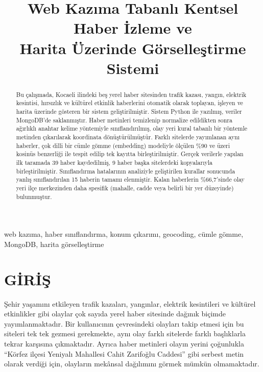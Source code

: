 \documentclass[conference,a4paper]{IEEEtran}
\begin{document}
\title{Web Kazıma Tabanlı Kentsel Haber İzleme ve\\Harita Üzerinde Görselleştirme Sistemi}

\author{

}

\maketitle

\begin{abstract}
Bu çalışmada, Kocaeli ilindeki beş yerel haber sitesinden trafik kazası, yangın,
elektrik kesintisi, hırsızlık ve kültürel etkinlik haberlerini otomatik olarak
toplayan, işleyen ve harita üzerinde gösteren bir sistem geliştirilmiştir. Sistem
Python ile yazılmış, veriler MongoDB'de saklanmıştır. Haber metinleri temizlenip
normalize edildikten sonra ağırlıklı anahtar kelime yöntemiyle sınıflandırılmış,
olay yeri kural tabanlı bir yöntemle metinden çıkarılarak koordinata
dönüştürülmüştür. Farklı sitelerde yayımlanan aynı haberler, çok dilli bir cümle
gömme (embedding) modeliyle ölçülen \%90 ve üzeri kosinüs benzerliği ile tespit
edilip tek kayıtta birleştirilmiştir. Gerçek verilerle yapılan ilk taramada 39
haber kaydedilmiş, 9 haber başka sitelerdeki kopyalarıyla birleştirilmiştir.
Sınıflandırma hatalarının analiziyle geliştirilen kurallar sonucunda yanlış
sınıflandırılan 15 haberin tamamı elenmiştir. Kalan haberlerin \%66,7'sinde olay
yeri ilçe merkezinden daha spesifik (mahalle, cadde veya belirli bir yer
düzeyinde) bulunmuştur.
\end{abstract}

\begin{IEEEkeywords}
web kazıma, haber sınıflandırma, konum çıkarımı, geocoding, cümle gömme,
MongoDB, harita görselleştirme
\end{IEEEkeywords}

\section{GİRİŞ}
Şehir yaşamını etkileyen trafik kazaları, yangınlar, elektrik kesintileri ve
kültürel etkinlikler gibi olaylar çok sayıda yerel haber sitesinde dağınık
biçimde yayımlanmaktadır. Bir kullanıcının çevresindeki olayları takip etmesi
için bu siteleri tek tek gezmesi gerekmekte, aynı olay farklı sitelerde farklı
başlıklarla tekrar karşısına çıkmaktadır. Ayrıca haber metinleri olayın yerini
çoğunlukla ``Körfez ilçesi Yeniyalı Mahallesi Cahit Zarifoğlu Caddesi'' gibi
serbest metin olarak verdiği için, olayların mekânsal dağılımını görmek mümkün
olmamaktadır.
\end{document}
